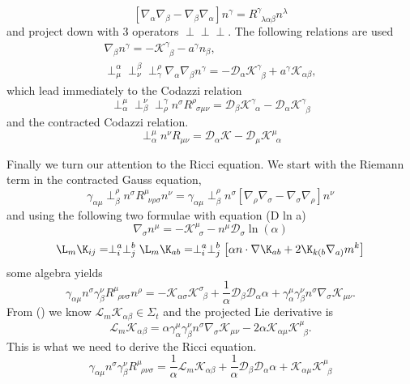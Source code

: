 $$  [\nabla_\alpha\nabla_\beta-\nabla_\beta\nabla_\alpha]n^\gamma = {R}^\gamma_{\,\,\,\lambda \alpha\beta}n^\lambda $$
and project down with 3 operators $\perp\perp\perp$. The following relations are used 
\begin{gather*} \nabla_\beta n^\gamma = -\mathcal{K}^\gamma_{\,\,\,\beta} - a^\gamma n_\beta,\\
 \perp^\alpha_\mu \perp^\beta_\nu \perp^\rho_\gamma \nabla_\alpha \nabla_\beta n^\gamma = -\mathcal{D}_\alpha \mathcal{K}^\gamma_{\,\,\,\beta} + a^\gamma \mathcal{K}_{\alpha\beta},\end{gather*}
which lead immediately to the Codazzi relation
\begin{equation}\perp_\alpha^\mu \perp_\beta^\nu \perp^\gamma_\rho n^\sigma R^\rho_{\,\,\,\sigma\mu\nu} =  \mathcal{D}_\beta \mathcal{K}^\gamma_{\,\,\,\alpha} -\mathcal{D}_\alpha \mathcal{K}^\gamma_{\,\,\,\beta}\end{equation}
and the contracted Codazzi relation.
\begin{equation}\perp^\mu_\alpha  n^\nu R_{\mu\nu} =  \mathcal{D}_\alpha \mathcal{K} -\mathcal{D}_\mu \mathcal{K}^\mu_{\,\,\,\alpha}\end{equation}

Finally we turn our attention to the Ricci equation. We start with the Riemann term in the contracted Gauss equation,
\[\gamma_{\alpha\mu}\perp^\rho_\beta n^\sigma R^\mu_{\,\,\,\nu\rho\sigma}n^\nu =
\gamma_{\alpha\mu}\perp^\rho_\beta n^\sigma\left[ \nabla_\rho\nabla_\sigma-\nabla_\sigma\nabla_\rho\right]n^\nu\]
and using the following two formulae with equation (D ln a)
\[ \nabla_\sigma n^\mu = -\mathcal{K}^\mu_{\,\,\,\sigma}-n^\mu \mathcal{D}_\sigma \ln(\alpha)\]
\[ \L_m \K_{ij}  = \perp^a_i\perp^b_j\L_m \K_{ab} =\perp^a_i\perp^b_j\left[ \alpha n\cdot \nabla \K_{ab} + 2 \K_{k(b}\nabla_{a)}m^k\right] \]
some algebra yields
$$  \gamma_{\alpha\mu}n^\sigma \gamma^\nu_\beta R^\mu_{\,\,\,\rho\nu\sigma} n^\rho = -\mathcal{K}_{\alpha\sigma}\mathcal{K}^\sigma_{\,\,\,\beta} +\frac{1}{\alpha}\mathcal{D}_\beta\mathcal{D}_\alpha \alpha + \gamma^\mu_\alpha\gamma^\nu_\beta n^\sigma \nabla_\sigma \mathcal{K}_{\mu\nu}.$$
From () we know $\mathcal{L}_m\mathcal{K}_{\alpha\beta} \in \Sigma_t$ and the projected Lie derivative is
$$  \mathcal{L}_m\mathcal{K}_{\alpha\beta} = \alpha \gamma^\mu_\alpha \gamma^\nu_\beta n^\sigma \nabla_\sigma \mathcal{K}_{\mu\nu} - 2\alpha\mathcal{K}_{\alpha\mu}\mathcal{K}^\mu_{\,\,\,\beta}.$$
This is what we need to derive the Ricci equation.
\begin{equation}\gamma_{\alpha\mu}n^\sigma \gamma^\nu_\beta R^\mu_{\,\,\,\rho\nu\sigma} = \frac{1}{\alpha}\mathcal{L}_m \mathcal{K}_{\alpha\beta} +\frac{1}{\alpha}\mathcal{D}_\beta\mathcal{D}_\alpha \alpha +\mathcal{K}_{\alpha\mu}\mathcal{K}^\mu_{\,\,\,\beta}  \end{equation}

